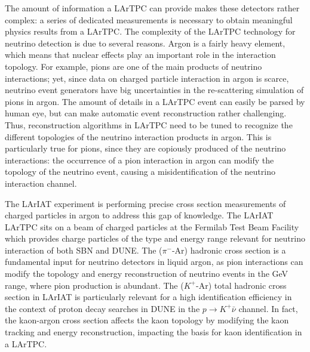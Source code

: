 The amount of information a LArTPC can provide makes these detectors rather complex: a series of dedicated measurements is necessary to obtain meaningful physics results from a LArTPC. The complexity of the LArTPC technology for neutrino detection is due to several reasons. Argon is a fairly heavy element, which means that nuclear effects play an important role in the interaction topology. For example, pions are one of the main products of neutrino interactions; yet,  since data on charged particle interaction in argon is scarce, neutrino event generators have big uncertainties in the re-scattering simulation of pions in argon. %
The amount of details in a LArTPC event can easily be parsed by human eye, but can make automatic event reconstruction rather challenging. Thus, reconstruction algorithms in LArTPC need to be tuned to recognize the different topologies of the neutrino interaction products in argon. This is particularly true for pions, since they are copiously produced of the neutrino interactions: the occurrence of a pion interaction in argon can modify the topology of the neutrino event, causing a misidentification of the neutrino interaction channel.

The LArIAT \cite{Cavanna:2014iqa} experiment is performing precise cross section measurements of charged particles in argon to address this gap of knowledge. 
The LArIAT LArTPC sits on a beam of charged particles at the Fermilab Test Beam Facility which provides charge particles of the type and energy range relevant for neutrino interaction of both SBN and DUNE. The ($\pi^-$-Ar) hadronic cross section is a fundamental input for neutrino detectors in liquid argon, as pion interactions can modify the topology and energy reconstruction of neutrino events in the GeV range, where pion production is abundant. The  ($K^+$-Ar) total hadronic cross section in LArIAT is particularly relevant for a high identification efficiency in the context of proton decay searches in DUNE in the  $p\rightarrow K^+\bar{\nu}$  channel. In fact, the kaon-argon cross section affects the kaon topology by modifying the kaon tracking and energy reconstruction, impacting the basis for kaon identification in a LArTPC.  

